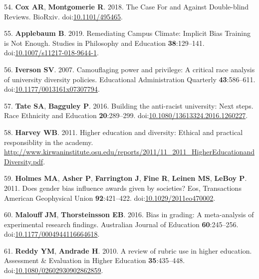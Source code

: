 \documentclass[11pt,]{article}
\begin{document}
\leavevmode\hypertarget{ref-cox_case_2018}{}%
54. \textbf{Cox AR}, \textbf{Montgomerie R}. 2018. The Case For and
Against Double-blind Reviews. BioRxiv.
doi:\href{https://doi.org/10.1101/495465}{10.1101/495465}.

\leavevmode\hypertarget{ref-applebaum_remediating_2019}{}%
55. \textbf{Applebaum B}. 2019. Remediating Campus Climate: Implicit
Bias Training is Not Enough. Studies in Philosophy and Education
\textbf{38}:129--141.
doi:\href{https://doi.org/10.1007/s11217-018-9644-1}{10.1007/s11217-018-9644-1}.

\leavevmode\hypertarget{ref-Iverson2007}{}%
56. \textbf{Iverson SV}. 2007. Camouflaging power and privilege: A
critical race analysis of university diversity policies. Educational
Administration Quarterly \textbf{43}:586--611.
doi:\href{https://doi.org/10.1177/0013161x07307794}{10.1177/0013161x07307794}.

\leavevmode\hypertarget{ref-Tate2016}{}%
57. \textbf{Tate SA}, \textbf{Bagguley P}. 2016. Building the
anti-racist university: Next steps. Race Ethnicity and Education
\textbf{20}:289--299.
doi:\href{https://doi.org/10.1080/13613324.2016.1260227}{10.1080/13613324.2016.1260227}.

\leavevmode\hypertarget{ref-harvey_diversity_2011}{}%
58. \textbf{Harvey WB}. 2011. Higher education and diversity: Ethical
and practical responsiblity in the academy.
\url{http://www.kirwaninstitute.osu.edu/reports/2011/11_2011_HigherEducationandDiversity.pdf}.

\leavevmode\hypertarget{ref-Holmes2011}{}%
59. \textbf{Holmes MA}, \textbf{Asher P}, \textbf{Farrington J},
\textbf{Fine R}, \textbf{Leinen MS}, \textbf{LeBoy P}. 2011. Does gender
bias influence awards given by societies? Eos, Transactions American
Geophysical Union \textbf{92}:421--422.
doi:\href{https://doi.org/10.1029/2011eo470002}{10.1029/2011eo470002}.

\leavevmode\hypertarget{ref-Malouff2016}{}%
60. \textbf{Malouff JM}, \textbf{Thorsteinsson EB}. 2016. Bias in
grading: A meta-analysis of experimental research findings. Australian
Journal of Education \textbf{60}:245--256.
doi:\href{https://doi.org/10.1177/0004944116664618}{10.1177/0004944116664618}.

\leavevmode\hypertarget{ref-Reddy2010}{}%
61. \textbf{Reddy YM}, \textbf{Andrade H}. 2010. A review of rubric use
in higher education. Assessment \& Evaluation in Higher Education
\textbf{35}:435--448.
doi:\href{https://doi.org/10.1080/02602930902862859}{10.1080/02602930902862859}.
\end{document}
